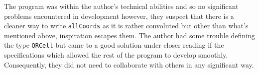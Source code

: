 \documentclass[11pt]{article}
\begin{document}
   The program was within the author's technical abilities and so no significant problems encountered in development however, they suspect that there is a cleaner way to write \verb|allCoords| as it is rather convoluted but other than what's mentioned above, inspiration escapes them. The author had some trouble defining the type \verb|QRCell| but came to a good solution under closer reading if the specifications which allowed the rest of the program to develop smoothly. Consequently, they did not need to collaborate with others in any significant way.






\end{document}
